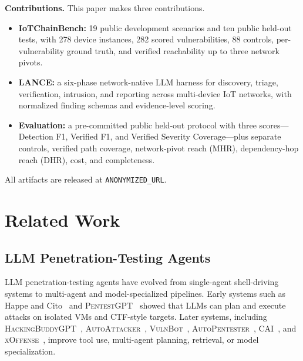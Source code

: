 \documentclass[conference,compsoc]{IEEEtran}
\newcommand{\systemname}{IoTChainBench\xspace}
\newcommand{\harnessname}{\textsc{LANCE}\xspace}
\begin{document}
\medskip\noindent\textbf{Contributions.}
This paper makes three contributions.
\begin{itemize}[leftmargin=*,nosep]
  \item \textbf{\systemname{}:} 19 public development scenarios and ten public held-out tests, with 278 device instances, 282 scored vulnerabilities, 88 controls, per-vulnerability ground truth, and verified reachability up to three network pivots.
  \item \textbf{\harnessname{}:} a six-phase network-native LLM harness for discovery, triage, verification, intrusion, and reporting across multi-device IoT networks, with normalized finding schemas and evidence-level scoring.
  \item \textbf{Evaluation:} a pre-committed public held-out protocol with three scores---Detection F1, Verified F1, and Verified Severity Coverage---plus separate controls, verified path coverage, network-pivot reach (MHR), dependency-hop reach (DHR), cost, and completeness.
\end{itemize}

All artifacts are released at \texttt{ANONYMIZED\_URL}.


\section{Related Work}
\label{sec:related}

\subsection{LLM Penetration-Testing Agents}
\label{sec:related:llm}

LLM penetration-testing agents have evolved from single-agent shell-driving systems to multi-agent and model-specialized pipelines. Early systems such as Happe and Cito~\cite{happe23} and \textsc{PentestGPT}~\cite{pentestgpt24} showed that LLMs can plan and execute attacks on isolated VMs and CTF-style targets. Later systems, including \textsc{HackingBuddyGPT}~\cite{hackingbuddygpt}, \textsc{AutoAttacker}~\cite{autoattacker24}, \textsc{VulnBot}~\cite{vulnbot25}, \textsc{AutoPentester}~\cite{autopentester25}, \textsc{CAI}~\cite{cai25}, and \textsc{xOffense}~\cite{xoffense25}, improve tool use, multi-agent planning, retrieval, or model specialization.
\end{document}
